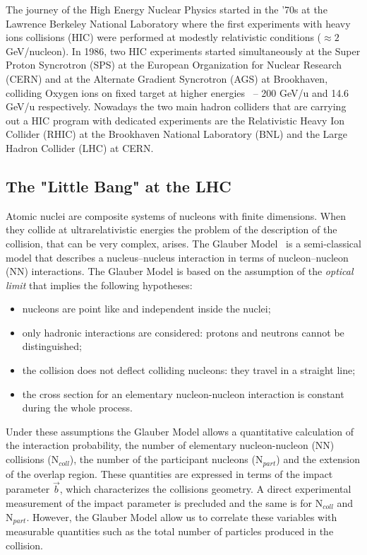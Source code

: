 The journey of the High Energy Nuclear Physics started in the '70s at the Lawrence Berkeley National
Laboratory where the first experiments with heavy ions collisions (HIC) were performed at modestly
relativistic conditions ($\approx 2\ $ GeV/nucleon).
In 1986, two HIC experiments started simultaneously at the Super Proton Syncrotron (SPS) at
the European Organization for Nuclear Research (CERN) and at the Alternate Gradient Syncrotron (AGS)
at Brookhaven, colliding Oxygen ions on fixed target at higher energies \ -- 200 GeV/u and 14.6 GeV/u
respectively.
Nowadays the two main hadron colliders that are carrying out a HIC program with dedicated experiments
are the Relativistic Heavy Ion Collider (RHIC) at the Brookhaven National Laboratory (BNL) and the 
Large Hadron Collider (LHC) at CERN.

%
\subsection{The "Little Bang" at the LHC}
\label{sec:1.3.1}

Atomic nuclei are composite systems of nucleons with finite dimensions. When they collide at 
ultrarelativistic energies the problem of the description of the collision, that can be very
complex, arises.
The Glauber Model~\cite{glauber} is a semi-classical model that describes a nucleus–nucleus 
interaction in terms of nucleon–nucleon (NN) interactions.
The Glauber Model is based on the assumption of the \textit{optical limit} that implies the following hypotheses:
\begin{itemize}
    \item nucleons are point like and independent inside the nuclei;
    \item only hadronic interactions are considered: protons and neutrons cannot be distinguished;
    \item the collision does not deflect colliding nucleons: they travel in a straight line;
    \item the cross section for an elementary nucleon-nucleon interaction is constant during the whole 
    process.
\end{itemize}
Under these assumptions the Glauber Model allows a quantitative calculation of the interaction
probability, the number of elementary nucleon-nucleon (NN) collisions ($\mathrm{N}_{coll}$), the number
of the participant nucleons ($\mathrm{N}_{part}$) and the extension of the overlap region.
These quantities are expressed in terms of the impact parameter $\vec{b}$, which characterizes
the collisions geometry.
A direct experimental measurement of the impact parameter is precluded and the same is for
$\mathrm{N}_{coll}$ and $\mathrm{N}_{part}$.
However, the Glauber Model allow us to correlate these variables with measurable quantities
such as the total number of particles produced in the collision.

